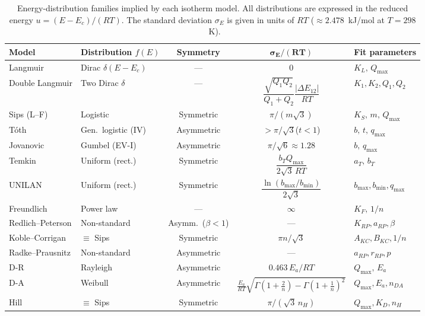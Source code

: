 \documentclass[journal=aamick,manuscript=article]{achemso}
\begin{document}
\begin{table}[H]
	\centering
	\small
	\caption{Energy-distribution families implied by each isotherm model.
		All distributions are expressed in the reduced energy
		$u = (E - E_c)/(RT)$.  The standard deviation $\sigma_E$ is given
		in units of $RT$ ($\approx 2.478$~kJ/mol at $T = 298$~K).}
	\label{tab:si_energy_dist_families}
	\renewcommand{\arraystretch}{1.5}
	\begin{tabular}{@{} l l c c l @{}}
		\toprule
		\textbf{Model}
		& \textbf{Distribution $f(E)$}
		& \textbf{Symmetry}
		& $\boldsymbol{\sigma_E/(RT)}$
		& \textbf{Fit parameters} \\
		\midrule
		Langmuir
		& Dirac $\delta(E - E_c)$
		& ---
		& $0$
		& $K_L,\, Q_{\max}$ \\
		Double Langmuir
		& Two Dirac $\delta$
		& ---
		& $\dfrac{\sqrt{Q_1Q_2}}{Q_1+Q_2}\dfrac{|\Delta E_{12}|}{RT}$
		& $K_1, K_2, Q_1, Q_2$ \\
		Sips (L--F)
		& Logistic
		& Symmetric
		& $\pi/(m\sqrt{3})$
		& $K_S,\, m,\, Q_{\max}$ \\
		T\'{o}th
		& Gen.\ logistic (IV)
		& Asymmetric
		& $> \pi/\sqrt{3}$\;($t<1$)
		& $b,\, t,\, q_{\max}$ \\
		Jovanovic
		& Gumbel (EV-I)
		& Asymmetric
		& $\pi/\sqrt{6} \approx 1.28$
		& $b,\, q_{\max}$ \\
		Temkin
		& Uniform (rect.)
		& Symmetric
		& $\dfrac{b_T Q_{\max}}{2\sqrt{3}\,RT}$
		& $a_T,\, b_T$ \\
		UNILAN
		& Uniform (rect.)
		& Symmetric
		& $\dfrac{\ln(b_{\max}/b_{\min})}{2\sqrt{3}}$
		& $b_{\max}, b_{\min}, q_{\max}$ \\
		Freundlich
		& Power law
		& ---
		& $\infty$
		& $K_F,\, 1/n$ \\
		Redlich--Peterson
		& Non-standard
		& Asymm.\ ($\beta<1$)
		& ---
		& $K_{RP}, a_{RP}, \beta$ \\
		Koble--Corrigan
		& $\equiv$ Sips
		& Symmetric
		& $\pi n/\sqrt{3}$
		& $A_{KC}, B_{KC}, 1/n$ \\
		Radke--Prausnitz
		& Non-standard
		& Asymmetric
		& ---
		& $a_{RP}, r_{RP}, p$ \\
		D-R
		& Rayleigh
		& Asymmetric
		& $0.463\,E_a/RT$
		& $Q_{\max},\, E_a$ \\
		D-A
		& Weibull
		& Asymmetric
		& $\frac{E_a}{RT}\!\sqrt{\Gamma(1\!+\!\frac{2}{n})\!-\!\Gamma(1\!+\!\frac{1}{n})^2}$
		& $Q_{\max}, E_a, n_{DA}$ \\
		Hill
		& $\equiv$ Sips
		& Symmetric
		& $\pi/(\sqrt{3}\,n_H)$
		& $Q_{\max}, K_D, n_H$ \\
		\bottomrule
	\end{tabular}
\end{table}
\end{document}
